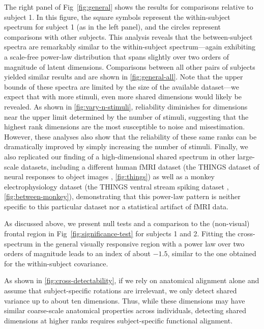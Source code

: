 \documentclass[10pt]{article}
\begin{document}
The right panel of Fig~\ref{fig:general} shows the results for comparisons relative to subject 1. In this figure, the square symbols represent the within-subject spectrum for subject 1 (as in the left panel), and the circles represent comparisons with other subjects. This analysis reveals that the between-subject spectra are remarkably similar to the within-subject spectrum---again exhibiting a scale-free power-law distribution that spans slightly over two orders of magnitude of latent dimensions. Comparisons between all other pairs of subjects yielded similar results and are shown in \ref{fig:general-all}. Note that the upper bounds of these spectra are limited by the size of the available dataset---we expect that with more stimuli, even more shared dimensions would likely be revealed. As shown in \ref{fig:vary-n-stimuli}, reliability diminishes for dimensions near the upper limit determined by the number of stimuli, suggesting that the highest rank dimensions are the most susceptible to noise and misestimation. However, these analyses also show that the reliability of these same ranks can be dramatically improved by simply increasing the number of stimuli. Finally, we also replicated our finding of a high-dimensional shared spectrum in other large-scale datasets, including a different human fMRI dataset (the THINGS dataset of neural responses to object images \autocite{Hebart2023}, \ref{fig:things}) as well as a monkey electrophysiology dataset (the THINGS ventral stream spiking dataset \autocite{Papale2025}, \ref{fig:between-monkey}), demonstrating that this power-law pattern is neither specific to this particular dataset nor a statistical artifact of fMRI data.

As discussed above, we present null tests and a comparison to the (non-visual) frontal region in Fig~\ref{fig:significance-test} for subjects 1 and 2. Fitting the cross-spectrum in the general visually responsive region with a power law over two orders of magnitude leads to an index of about \(-1.5\), similar to the one obtained for the within-subject covariance.

As shown in \ref{fig:cross-detectability}, if we rely on anatomical alignment alone and assume that subject-specific rotations are irrelevant, we only detect shared variance up to about ten dimensions. Thus, while these dimensions may have similar coarse-scale anatomical properties across individuals, detecting shared dimensions at higher ranks requires subject-specific functional alignment.
\end{document}
